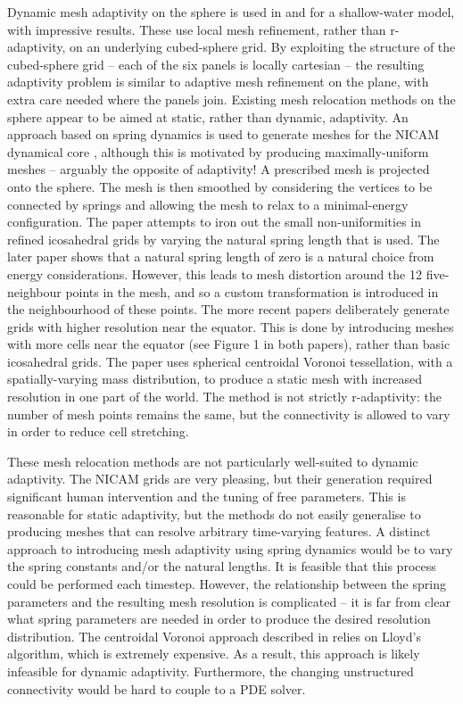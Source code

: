 \documentclass[11pt, a4paper]{scrartcl}  %
\theoremstyle{plain}
\theoremstyle{definition}
\numberwithin{equation}{section}
\begin{document}
Dynamic mesh adaptivity on the sphere is used in
\citet{mccorquodale2015adaptive} and \citet{ferguson2016analyzing} for
a shallow-water model, with impressive results. These use local mesh
refinement, rather than r-adaptivity, on an underlying cubed-sphere
grid. By exploiting the structure of the cubed-sphere grid -- each of
the six panels is locally cartesian -- the resulting adaptivity problem
is similar to adaptive mesh refinement on the plane, with extra care
needed where the panels join. Existing mesh relocation methods on the
sphere appear to be aimed at static, rather than dynamic, adaptivity. An
approach based on spring dynamics is used to generate meshes for the
NICAM dynamical core \citep{satoh2014nonhydrostatic}, although this is
motivated by producing maximally-uniform meshes -- arguably the opposite
of adaptivity! A prescribed mesh is projected onto the sphere. The mesh
is then smoothed by considering the vertices to be connected by springs
and allowing the mesh to relax to a minimal-energy configuration. The
paper \citet{tomita2002optimization} attempts to iron out the small
non-uniformities in refined icosahedral grids by varying the natural
spring length that is used. The later paper \citet{iga2014improved}
shows that a natural spring length of zero is a natural choice from
energy considerations. However, this leads to mesh distortion around the
12 five-neighbour points in the mesh, and so a custom transformation is
introduced in the neighbourhood of these points. The more recent papers
\citet{iga2015smooth,iga2017equatorially} deliberately generate grids
with higher resolution near the equator. This is done by introducing
meshes with more cells near the equator (see Figure 1 in both papers),
rather than basic icosahedral grids. The paper
\citet{ringler2011exploring} uses spherical centroidal Voronoi
tessellation, with a spatially-varying mass distribution, to produce a
static mesh with increased resolution in one part of the world. The
method is not strictly r-adaptivity: the number of mesh points remains
the same, but the connectivity is allowed to vary in order to reduce
cell stretching.

These mesh relocation methods are not particularly well-suited to
dynamic adaptivity. The NICAM grids are very pleasing, but their
generation required significant human intervention and the tuning of
free parameters. This is reasonable for static adaptivity, but the
methods do not easily generalise to producing meshes that can resolve
arbitrary time-varying features. A distinct approach to introducing mesh
adaptivity using spring dynamics would be to vary the spring constants
and/or the natural lengths. It is feasible that this process could be
performed each timestep. However, the relationship between the spring
parameters and the resulting mesh resolution is complicated -- it is far
from clear what spring parameters are needed in order to produce the
desired resolution distribution. The centroidal Voronoi approach
described in \citet{ringler2011exploring} relies on Lloyd's algorithm,
which is extremely expensive. As a result, this approach is likely
infeasible for dynamic adaptivity. Furthermore, the changing
unstructured connectivity would be hard to couple to a PDE solver.
\end{document}
